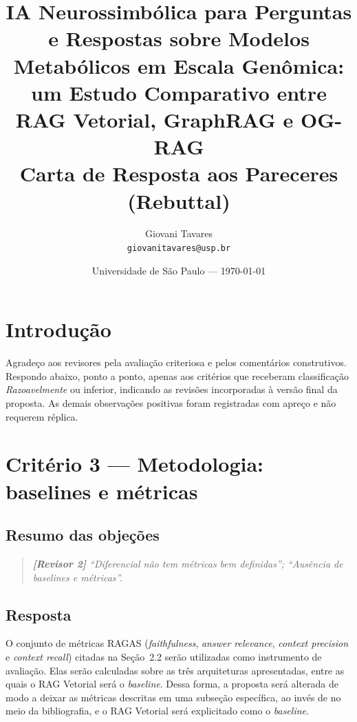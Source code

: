 \documentclass{article}
\title{IA Neurossimbólica para Perguntas e Respostas sobre Modelos Metabólicos em Escala Genômica: um Estudo Comparativo entre RAG Vetorial, GraphRAG e OG-RAG \\ \large Carta de Resposta aos Pareceres (Rebuttal)} %
\author{Giovani Tavares\\ \texttt{giovanitavares@usp.br}} %
\date{Universidade de São Paulo --- \today} %
\newenvironment{parecer}
{\begin{quote}\itshape\color{gray!70!black}\small}
	{\end{quote}}
\newcommand{\revisor}[1]{\textbf{[Revisor #1]}}
\begin{document}
	
	\maketitle %
	
	
	\section{Introdução}
	
	Agradeço aos revisores pela avaliação criteriosa e pelos comentários
	construtivos. Respondo abaixo, ponto a ponto, apenas aos critérios que
	receberam classificação \emph{Razoavelmente} ou inferior, indicando as
	revisões incorporadas à versão final da proposta. As demais observações
	positivas foram registradas com apreço e não requerem réplica.
	
	\section{Critério 3 --- Metodologia: baselines e métricas}
	
	\subsection{Resumo das objeções}
	\begin{parecer}
		\revisor{2} ``Diferencial não tem métricas bem definidas'';
		``Ausência de baselines e métricas''.
	\end{parecer}
	
	\subsection{Resposta}
	
	O conjunto de métricas RAGAS (\textit{faithfulness}, \textit{answer relevance},
	\textit{context precision} e \textit{context recall}) citadas na Seção~2.2 serão
	utilizadas como instrumento de avaliação. Elas serão calculadas sobre as três
	arquiteturas apresentadas, entre as quais o RAG Vetorial será o \textit{baseline}.
	Dessa forma, a proposta será alterada de modo a deixar as métricas descritas em
	uma subseção específica, ao invés de no meio da bibliografia, e o RAG Vetorial
	será explicitado como o \textit{baseline}.
	
\end{document}
